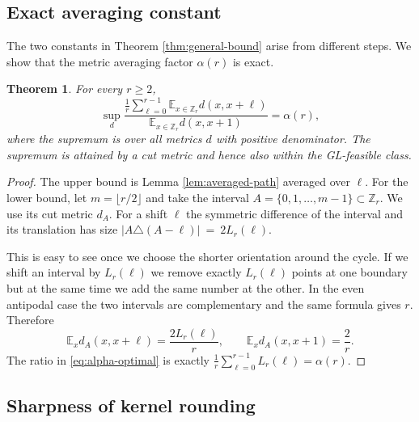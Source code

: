 \documentclass[11pt]{article}
\newtheorem{theorem}{Theorem}[section]
\theoremstyle{definition}
\theoremstyle{remark}
\newcommand{\E}{\mathbb{E}}
\newcommand{\Z}{\mathbb{Z}}
\begin{document}


\subsection{Exact averaging constant}
The two constants in Theorem \ref{thm:general-bound} arise from different steps. We show that the metric averaging factor $\alpha(r)$ is exact. 


\begin{theorem}\label{thm:alpha-optimal}
For every $r\ge2$,
\begin{equation}\label{eq:alpha-optimal}
  \sup_d
  \frac{
    \frac1{r}\sum_{\ell=0}^{r-1}\E_{x\in\Z_r}d(x,x+\ell)
  }{
    \E_{x\in\Z_r}d(x,x+1)
  }
  =\alpha(r),
\end{equation}
where the supremum is over all metrics $d$ with positive denominator. The supremum is attained by a cut metric and hence also within the GL-feasible class.
\end{theorem}

\begin{proof}
The upper bound is Lemma \ref{lem:averaged-path} averaged over $\ell$. For the lower bound, let $m=\lfloor r/2\rfloor$ and take the interval $A=\{0,1,\ldots,m-1\}\subset\Z_r$. We use its cut metric $d_A$. For a shift $\ell$ the symmetric difference of the interval and its translation has size $|A\triangle(A-\ell)|~=~2L_r(\ell)$.

This is easy to see once we choose the shorter orientation around the cycle. If we shift an interval by $L_r(\ell)$ we remove exactly $L_r(\ell)$ points at one boundary but at the same time we add the same number at the other. In the even antipodal case the two intervals are complementary and the same formula gives $r$. Therefore
\[
  \E_xd_A(x,x+\ell)=\frac{2L_r(\ell)}r,
  \qquad
  \E_xd_A(x,x+1)=\frac2r.
\]
The ratio in \eqref{eq:alpha-optimal} is exactly $  \frac1{r}\sum_{\ell=0}^{r-1}L_r(\ell)=\alpha(r)$.
\end{proof}


\iffalse
\subsection{Sharpness of kernel rounding}
\end{document}

